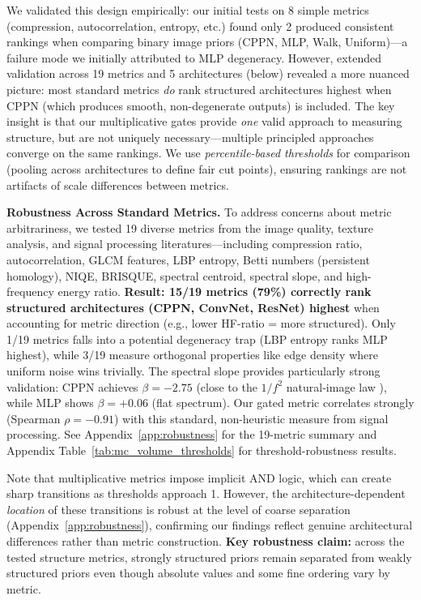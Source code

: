 \documentclass{article}
\begin{document}
We validated this design empirically: our initial tests on 8 simple metrics (compression, autocorrelation, entropy, etc.) found only 2 produced consistent rankings when comparing binary image priors (CPPN, MLP, Walk, Uniform)---a failure mode we initially attributed to MLP degeneracy. However, extended validation across 19 metrics and 5 architectures (below) revealed a more nuanced picture: most standard metrics \emph{do} rank structured architectures highest when CPPN (which produces smooth, non-degenerate outputs) is included. The key insight is that our multiplicative gates provide \emph{one} valid approach to measuring structure, but are not uniquely necessary---multiple principled approaches converge on the same rankings. We use \emph{percentile-based thresholds} for comparison (pooling across architectures to define fair cut points), ensuring rankings are not artifacts of scale differences between metrics.

\textbf{Robustness Across Standard Metrics.} To address concerns about metric arbitrariness, we tested 19 diverse metrics from the image quality, texture analysis, and signal processing literatures---including compression ratio, autocorrelation, GLCM features, LBP entropy, Betti numbers (persistent homology), NIQE, BRISQUE, spectral centroid, spectral slope, and high-frequency energy ratio. \textbf{Result: 15/19 metrics (79\%) correctly rank structured architectures (CPPN, ConvNet, ResNet) highest} when accounting for metric direction (e.g., lower HF-ratio = more structured). Only 1/19 metrics falls into a potential degeneracy trap (LBP entropy ranks MLP highest), while 3/19 measure orthogonal properties like edge density where uniform noise wins trivially. The spectral slope provides particularly strong validation: CPPN achieves $\beta = -2.75$ (close to the $1/f^2$ natural-image law \cite{field1987relations}), while MLP shows $\beta = +0.06$ (flat spectrum). Our gated metric correlates strongly (Spearman $\rho = -0.91$) with this standard, non-heuristic measure from signal processing. See Appendix~\ref{app:robustness} for the 19-metric summary and Appendix Table~\ref{tab:mc_volume_thresholds} for threshold-robustness results.

Note that multiplicative metrics impose implicit AND logic, which can create sharp transitions as thresholds approach 1. However, the architecture-dependent \emph{location} of these transitions is robust at the level of coarse separation (Appendix~\ref{app:robustness}), confirming our findings reflect genuine architectural differences rather than metric construction. \textbf{Key robustness claim:} across the tested structure metrics, strongly structured priors remain separated from weakly structured priors even though absolute values and some fine ordering vary by metric.
\end{document}
